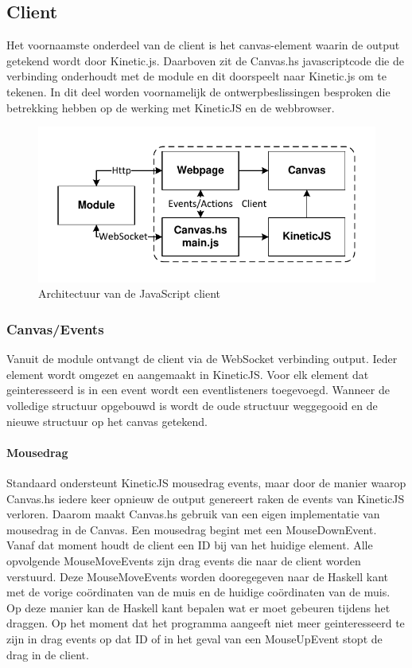 
\subsection{Client}
Het voornaamste onderdeel van de client is het canvas-element waarin de output getekend wordt door Kinetic.js. Daarboven zit de Canvas.hs javascriptcode die de verbinding onderhoudt met de module en dit doorspeelt naar Kinetic.js om te tekenen. In dit deel worden voornamelijk de ontwerpbeslissingen besproken die betrekking hebben op de werking met KineticJS en de webbrowser.

\begin{figure}
\begin{center}
\includegraphics[keepaspectratio,width=\textwidth]{./images/client_architecture.pdf}
\caption{Architectuur van de JavaScript client}
\label{fig:architecture_client}
\end{center}
\end{figure}

\subsubsection{Canvas/Events}
Vanuit de module ontvangt de client via de WebSocket verbinding output. Ieder element wordt omgezet en aangemaakt in KineticJS. Voor elk element dat geinteresseerd is in een event wordt een eventlisteners toegevoegd. Wanneer de volledige structuur opgebouwd is wordt de oude structuur weggegooid en de nieuwe structuur op het canvas getekend.

\paragraph{Mousedrag}
Standaard ondersteunt KineticJS mousedrag events, maar door de manier waarop Canvas.hs iedere keer opnieuw de output genereert raken de events van KineticJS verloren. Daarom maakt Canvas.hs gebruik van een eigen implementatie van mousedrag in de Canvas. Een mousedrag begint met een MouseDownEvent. Vanaf dat moment houdt de client een ID bij van het huidige element. Alle opvolgende MouseMoveEvents zijn drag events die naar de client worden verstuurd. Deze MouseMoveEvents worden dooregegeven naar de Haskell kant met de vorige coördinaten van de muis en de huidige coördinaten van de muis.
Op deze manier kan de Haskell kant bepalen wat er moet gebeuren tijdens het draggen. Op het moment dat het programma aangeeft niet meer geinteresseerd te zijn in drag events op dat ID of in het geval van een MouseUpEvent stopt de drag in de client.

